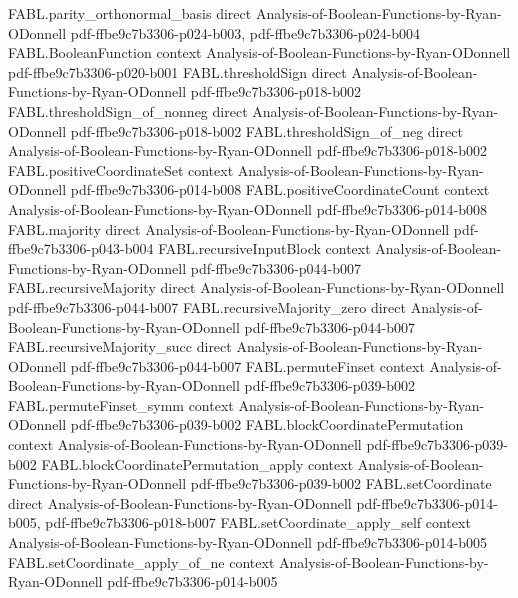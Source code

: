 \begin{theorem}
  {FABL.parity_orthonormal_basis}
  {direct}
  {Analysis-of-Boolean-Functions-by-Ryan-ODonnell}
  {pdf-ffbe9c7b3306-p024-b003,
    pdf-ffbe9c7b3306-p024-b004}
\proofstep
  {FABL.BooleanFunction}
  {context}
  {Analysis-of-Boolean-Functions-by-Ryan-ODonnell}
  {pdf-ffbe9c7b3306-p020-b001}
\proofstep
  {FABL.thresholdSign}
  {direct}
  {Analysis-of-Boolean-Functions-by-Ryan-ODonnell}
  {pdf-ffbe9c7b3306-p018-b002}
\proofstep
  {FABL.thresholdSign_of_nonneg}
  {direct}
  {Analysis-of-Boolean-Functions-by-Ryan-ODonnell}
  {pdf-ffbe9c7b3306-p018-b002}
\proofstep
  {FABL.thresholdSign_of_neg}
  {direct}
  {Analysis-of-Boolean-Functions-by-Ryan-ODonnell}
  {pdf-ffbe9c7b3306-p018-b002}
\proofstep
  {FABL.positiveCoordinateSet}
  {context}
  {Analysis-of-Boolean-Functions-by-Ryan-ODonnell}
  {pdf-ffbe9c7b3306-p014-b008}
\proofstep
  {FABL.positiveCoordinateCount}
  {context}
  {Analysis-of-Boolean-Functions-by-Ryan-ODonnell}
  {pdf-ffbe9c7b3306-p014-b008}
\proofstep
  {FABL.majority}
  {direct}
  {Analysis-of-Boolean-Functions-by-Ryan-ODonnell}
  {pdf-ffbe9c7b3306-p043-b004}
\proofstep
  {FABL.recursiveInputBlock}
  {context}
  {Analysis-of-Boolean-Functions-by-Ryan-ODonnell}
  {pdf-ffbe9c7b3306-p044-b007}
\proofstep
  {FABL.recursiveMajority}
  {direct}
  {Analysis-of-Boolean-Functions-by-Ryan-ODonnell}
  {pdf-ffbe9c7b3306-p044-b007}
\proofstep
  {FABL.recursiveMajority_zero}
  {direct}
  {Analysis-of-Boolean-Functions-by-Ryan-ODonnell}
  {pdf-ffbe9c7b3306-p044-b007}
\proofstep
  {FABL.recursiveMajority_succ}
  {direct}
  {Analysis-of-Boolean-Functions-by-Ryan-ODonnell}
  {pdf-ffbe9c7b3306-p044-b007}
\proofstep
  {FABL.permuteFinset}
  {context}
  {Analysis-of-Boolean-Functions-by-Ryan-ODonnell}
  {pdf-ffbe9c7b3306-p039-b002}
\proofstep
  {FABL.permuteFinset_symm}
  {context}
  {Analysis-of-Boolean-Functions-by-Ryan-ODonnell}
  {pdf-ffbe9c7b3306-p039-b002}
\proofstep
  {FABL.blockCoordinatePermutation}
  {context}
  {Analysis-of-Boolean-Functions-by-Ryan-ODonnell}
  {pdf-ffbe9c7b3306-p039-b002}
\proofstep
  {FABL.blockCoordinatePermutation_apply}
  {context}
  {Analysis-of-Boolean-Functions-by-Ryan-ODonnell}
  {pdf-ffbe9c7b3306-p039-b002}
\proofstep
  {FABL.setCoordinate}
  {direct}
  {Analysis-of-Boolean-Functions-by-Ryan-ODonnell}
  {pdf-ffbe9c7b3306-p014-b005,
    pdf-ffbe9c7b3306-p018-b007}
\proofstep
  {FABL.setCoordinate_apply_self}
  {context}
  {Analysis-of-Boolean-Functions-by-Ryan-ODonnell}
  {pdf-ffbe9c7b3306-p014-b005}
\proofstep
  {FABL.setCoordinate_apply_of_ne}
  {context}
  {Analysis-of-Boolean-Functions-by-Ryan-ODonnell}
  {pdf-ffbe9c7b3306-p014-b005}

\end{theorem}
